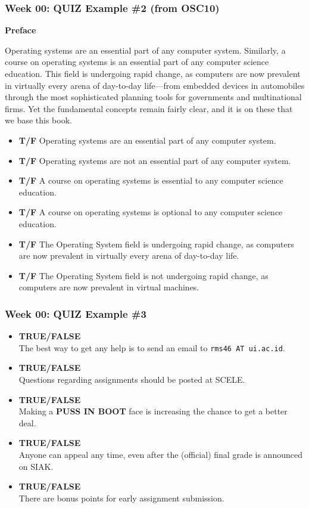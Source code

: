 \documentclass[aspectratio=169, xcolor=table, notheorems, hyperref={pdfpagelabels=false}]{beamer}
\begin{document}
\begin{frame}
\frametitle{Week 00: QUIZ Example \#2 (from OSC10)}

  \textbf{Preface}

  Operating systems are an essential part of any computer system. 
  Similarly, a course on operating systems is an essential part of any computer science education. 
  This field is undergoing rapid change, as computers are now prevalent in virtually 
  every arena of day-to-day life—from embedded devices in automobiles through the most 
  sophisticated planning tools for governments and multinational firms. 
  Yet the fundamental concepts remain fairly clear, and it is on these that we base this book.

  \begin{itemize}
  \item \textbf{T/F} 
     Operating systems are an essential part of any computer system.
  \item \textbf{T/F} 
     Operating systems are not an essential part of any computer system.
  \item \textbf{T/F} 
     A course on operating systems is essential to any computer science education.
  \item \textbf{T/F} 
     A course on operating systems is optional to any computer science education.
  \item \textbf{T/F} 
     The Operating System field is undergoing rapid change, as computers are now prevalent 
     in virtually every arena of day-to-day life.
  \item \textbf{T/F} 
     The Operating System field is not undergoing rapid change, as computers are now prevalent in virtual machines.
  \end{itemize}

\end{frame}

\begin{frame}
\frametitle{Week 00: QUIZ Example \#3}
\begin{itemize}
\item \textbf{TRUE/FALSE}\\
      The best way to get any help is to send an email to \texttt{rms46 AT ui.ac.id}.
\item \textbf{TRUE/FALSE}\\
      Questions regarding assignments should be posted at SCELE.
\item \textbf{TRUE/FALSE}\\
      Making a \textbf{PUSS IN BOOT} face is increasing the chance to get a better deal.
\item \textbf{TRUE/FALSE}\\
      Anyone can appeal any time, even after the (official) final grade is announced on SIAK.
\item \textbf{TRUE/FALSE}\\
      There are bonus points for early assignment submission.
\end{itemize}
\end{frame}
\end{document}
